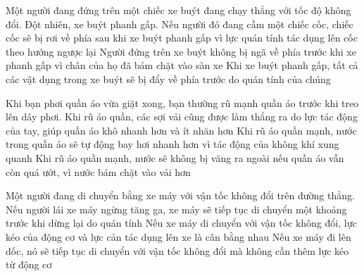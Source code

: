 \begin{ex}%
Một người đang đứng trên một chiếc xe buýt đang chạy thẳng với tốc độ không đổi. Đột nhiên, xe buýt phanh gấp.
{Nếu người đó đang cầm một chiếc cốc, chiếc cốc sẽ bị rơi về phía sau khi xe buýt phanh gấp vì lực quán tính tác dụng lên cốc theo hướng ngược lại} 
{Người đứng trên xe buýt không bị ngã về phía trước khi xe phanh gấp vì chân của họ đã bám chặt vào sàn xe} 
{\True Khi xe buýt phanh gấp, tất cả các vật dụng trong xe buýt sẽ bị đẩy về phía trước do quán tính của chúng} 
\loigiai{}
\end{ex}
\begin{ex}%
Khi bạn phơi quần áo vừa giặt xong, bạn thường rũ mạnh quần áo trước khi treo lên dây phơi.
{\True Khi rũ áo quần, các sợi vải cũng được làm thẳng ra do lực tác động của tay, giúp quần áo khô nhanh hơn và ít nhăn hơn} 
{Khi rũ áo quần mạnh, nước trong quần áo sẽ tự động bay hơi nhanh hơn vì tác động của không khí xung quanh} 
{Khi rũ áo quần mạnh, nước sẽ không bị văng ra ngoài nếu quần áo vẫn còn quá ướt, vì nước bám chặt vào vải hơn} 
\loigiai{}
\end{ex}
\begin{ex}%
Một người đang di chuyển bằng xe máy với vận tốc không đổi trên đường thẳng.
{\True Nếu người lái xe máy ngừng tăng ga, xe máy sẽ tiếp tục di chuyển một khoảng trước khi dừng lại do quán tính} 
{\True Nếu xe máy di chuyển với vận tốc không đổi, lực kéo của động cơ và lực cản tác dụng lên xe là cân bằng nhau} 
{Nếu xe máy đi lên dốc, nó sẽ tiếp tục di chuyển với vận tốc không đổi mà không cần thêm lực kéo từ động cơ} 
\loigiai{}
\end{ex}


\newpage 

